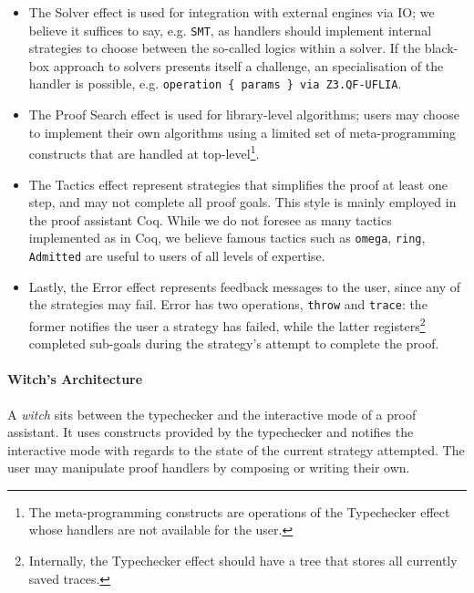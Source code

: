 \documentclass[sigconfl]{acmart}
\begin{document}
\begin{itemize}
  \item The Solver effect is used for integration with external engines via IO;
    we believe it suffices to say, e.g. \texttt{SMT}, as handlers should
    implement internal strategies to choose between the so-called logics
    within a solver. If the black-box approach to solvers presents itself a
    challenge, an specialisation of the handler is possible, e.g.
    \texttt{operation \{ params \} via Z3.QF-UFLIA}.
  \item The Proof Search effect is used for library-level algorithms; users may
    choose to implement their own algorithms using a limited set of
    meta-programming constructs that are handled at top-level\footnote{The
      meta-programming constructs are operations of the Typechecker effect
      whose handlers are not available for the user.}.
    \item The Tactics effect represent strategies that simplifies the proof at
      least one step, and may not complete all proof goals. This style is mainly
      employed in the proof assistant Coq. While we do not foresee as many
      tactics implemented as in Coq, we believe famous tactics such as
      \texttt{omega}, \texttt{ring}, \texttt{Admitted} are useful to users of
      all levels of expertise.
    \item Lastly, the Error effect represents feedback messages to the user,
      since any of the strategies may fail. Error has two operations,
      \texttt{throw} and \texttt{trace}: the former notifies the user a strategy
      has failed, while the latter registers\footnote{Internally, the
        Typechecker effect should have a tree that stores all currently
        saved traces.} completed sub-goals during the strategy's attempt to
      complete the proof.
\end{itemize}

\paragraph{Witch's Architecture}
A \textit{witch} sits between the typechecker and the interactive mode of a
proof assistant. It uses constructs provided by the typechecker and notifies the
interactive mode with regards to the state of the current strategy attempted.
The user may manipulate proof handlers by composing or writing their own.
\end{document}
